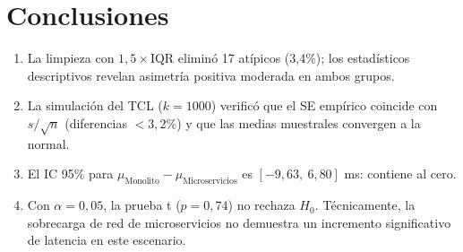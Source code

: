 \documentclass[12pt,a4paper]{article}
\begin{document}
\section{Conclusiones}
\begin{enumerate}
\item La limpieza con $1{,}5\times$IQR eliminó 17 atípicos (3,4\%); los estadísticos descriptivos revelan asimetría positiva moderada en ambos grupos.
\item La simulación del TCL ($k=1000$) verificó que el SE empírico coincide con $s/\sqrt{n}$ (diferencias $<3{,}2\%$) y que las medias muestrales convergen a la normal.
\item El IC 95\% para $\mu_{\text{Monolito}}-\mu_{\text{Microservicios}}$ es $[-9{,}63,\ 6{,}80]$ ms: contiene al cero.
\item Con $\alpha=0{,}05$, la prueba t ($p=0{,}74$) no rechaza $H_0$. Técnicamente, la sobrecarga de red de microservicios no demuestra un incremento significativo de latencia en este escenario.
\end{enumerate}



\end{document}
